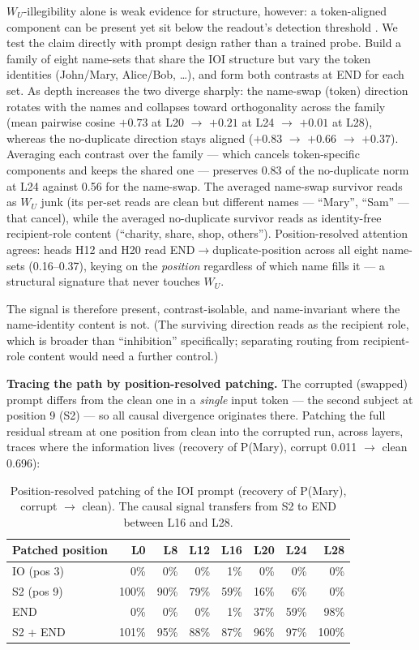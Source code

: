 \documentclass[11pt]{article}
\newcommand{\WU}{W_U}
\begin{document}
$\WU$-illegibility alone is weak evidence for structure, however: a
token-aligned component can be present yet sit below the readout's
detection threshold \citep{tuomi2026visibility}. We test the claim
directly with prompt design rather than a trained probe. Build a family of eight name-sets that share the IOI structure
but vary the token identities (John/Mary, Alice/Bob, \ldots), and form both contrasts
at END for each set. As depth increases the two diverge sharply: the name-swap
(token) direction rotates with the names and collapses toward orthogonality
across the family (mean pairwise cosine $+0.73$ at L20 $\rightarrow$ $+0.21$ at L24 $\rightarrow$ $+0.01$ at
L28), whereas the no-duplicate direction stays aligned ($+0.83$ $\rightarrow$ $+0.66$ $\rightarrow$ $+0.37$).
Averaging each contrast over the family --- which cancels token-specific
components and keeps the shared one --- preserves 0.83 of the no-duplicate norm at
L24 against 0.56 for the name-swap. The averaged name-swap survivor reads as
$\WU$ junk (its per-set reads are clean but different names --- ``Mary'', ``Sam'' --- that
cancel), while the averaged no-duplicate survivor reads as identity-free
recipient-role content (``charity, share, shop, others''). Position-resolved
attention agrees: heads H12 and H20 read END$\rightarrow$duplicate-position across all eight
name-sets (0.16--0.37), keying on the \emph{position} regardless of which name fills
it --- a structural signature that never touches $\WU$.

The signal is therefore present, contrast-isolable, and name-invariant
where the name-identity content is not. (The
surviving direction reads as the recipient role, which is broader than
``inhibition'' specifically; separating routing from recipient-role content would
need a further control.)

\textbf{Tracing the path by position-resolved patching.} The corrupted (swapped)
prompt differs from the clean one in a \emph{single} input token --- the second
subject at position 9 (S2) --- so all causal divergence originates there. Patching
the full residual stream at one position from clean into the corrupted run,
across layers, traces where the information lives (recovery of P(Mary), corrupt
0.011 $\rightarrow$ clean 0.696):

\begin{table}[htbp]
\centering
\small
\begin{tabular}{lrrrrrrr}
\toprule
Patched position & L0 & L8 & L12 & L16 & L20 & L24 & L28 \\
\midrule
IO (pos 3) & 0\% & 0\% & 0\% & 1\% & 0\% & 0\% & 0\% \\
S2 (pos 9) & 100\% & 90\% & 79\% & 59\% & 16\% & 6\% & 0\% \\
END & 0\% & 0\% & 0\% & 1\% & 37\% & 59\% & 98\% \\
S2 + END & 101\% & 95\% & 88\% & 87\% & 96\% & 97\% & 100\% \\
\bottomrule
\end{tabular}
\caption{Position-resolved patching of the IOI prompt (recovery of P(Mary), corrupt $\rightarrow$ clean). The causal signal transfers from S2 to END between L16 and L28.}
\label{tab:ioi-path}
\end{table}
\end{document}
